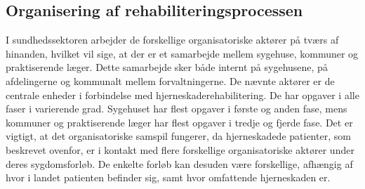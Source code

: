 \subsection{Organisering af rehabiliteringsprocessen}
I sundhedssektoren arbejder de forskellige organisatoriske aktører på tværs af hinanden, hvilket vil sige, at der er et samarbejde mellem sygehuse, kommuner og praktiserende læger. Dette samarbejde sker både internt på sygehusene, på afdelingerne og kommunalt mellem forvaltningerne. \cite{Sundhedsstyrelsen2010}
De nævnte aktører er de centrale enheder i forbindelse med hjerneskaderehabilitering. De har opgaver i alle faser i varierende grad. Sygehuset har flest opgaver i første og anden fase, mens kommuner og praktiserende læger har flest opgaver i tredje og fjerde fase. \cite{Sundhedsstyrelsen2011a}
Det er vigtigt, at det organisatoriske samspil fungerer, da hjerneskadede patienter, som beskrevet ovenfor, er i kontakt med flere forskellige organisatoriske aktører under deres sygdomsforløb. De enkelte forløb kan desuden være forskellige, afhængig af hvor i landet patienten befinder sig, samt hvor omfattende hjerneskaden er. \cite{Sundhedsstyrelsen2010}





